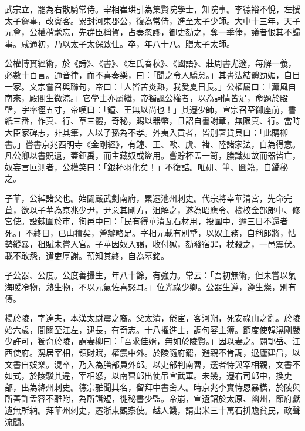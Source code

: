 \begin{pinyinscope}
 武宗立，罷為右散騎常侍。宰相崔珙引為集賢院學士，知院事。李德裕不悅，左授太子詹事，改賓客。累封河東郡公，復為常侍，進至太子少師。大中十三年，天子元會，公權稍耄忘，先群臣稱賀，占奏忽謬，御史劾之，奪一季俸，議者恨其不歸事。咸通初，乃以太子太保致仕。卒，年八十八。贈太子太師。



 公權博貫經術，於《詩》、《書》、《左氏春秋》、《國語》、莊周書尤邃，每解一義，必數十百言。通音律，而不喜奏樂，曰：「聞之令人驕怠。」其書法結體勁媚，自目一家。文宗嘗召與聯句，帝曰：「人皆苦炎熱，我愛夏日長。」公權屬曰：「薰風自南來，殿閣生微涼。」它學士亦屬繼，帝獨諷公權者，以為詞情皆足，命題於殿壁，字率徑五寸，帝嘆曰：「鐘、王無以尚也！」其遷少師，宣宗召至御座前，書紙三番，作真、行、草三體，奇秘，賜以器幣，且詔自書謝章，無限真、行。當時大臣家碑志，非其筆，人以子孫為不孝。外夷入貢者，皆別署貨貝曰：「此購柳書。」嘗書京兆西明寺《金剛經》，有鐘、王、歐、虞、褚、陸諸家法，自為得意。凡公卿以書貺遺，蓋鉅禹，而主藏奴或盜用。嘗貯杯盂一笥，縢識如故而器皆亡，奴妄言叵測者，公權笑曰：「銀杯羽化矣！」不復詰。唯研、筆、圖籍，自鐍秘之。



 子華，公綽諸父也。始闢嚴武劍南府，累遷池州刺史。代宗將幸華清宮，先命完葺，欲以子華為京兆少尹，尹惡其剛方，沮解之，遂為昭應令、檢校金部郎中、修宮使。設棘圍於市，徇邑中曰：「民有得華清瓦石材用，投圍中，逾三日不還者死。」不終日，已山積矣，營辦略足。宰相元載有別墅，以奴主務，自稱郎將，怙勢縱暴，租賦未嘗入官。子華因奴入謁，收付獄，劾發宿罪，杖殺之，一邑震伏。載不敢怨，遣吏厚謝。預知其終，自為墓銘。



 子公器、公度。公度善攝生，年八十餘，有強力。常云：「吾初無術，但未嘗以氣海暖冷物，熟生物，不以元氣佐喜怒耳。」位光祿少卿。公器生遵，遵生燦，別有傳。



 楊於陵，字達夫，本漢太尉震之裔。父太清，倦宦，客河朔，死安祿山之亂。於陵始六歲，間關至江左，逮長，有奇志。十八擢進士，調句容主簿。節度使韓滉剛嚴少許可，獨奇於陵，謂妻柳曰：「吾求佳婿，無如於陵賢。」因以妻之。闢鄂岳、江西使府。滉居宰相，領財賦，權震中外。於陵隨府罷，避親不肯調，退廬建昌，以文書自娛樂。滉卒，乃入為膳部員外郎。以吏部判南曹，選者恃與宰相親，文書不如式，於陵駁其違，宰相怒，以南曹郎出使吊宣武軍。未幾，遷右司郎中，換吏部，出為絳州刺史。德宗雅聞其名，留拜中書舍人。時京兆李實恃恩暴橫，於陵與所善許孟容不離附，為所譖短，徙秘書少監。帝崩，宣遺詔於太原、幽州，節府獻遺無所納。拜華州刺史，遷浙東觀察使。越人饑，請出米三十萬石抍贍貧民，政聲流聞。




\end{pinyinscope}
